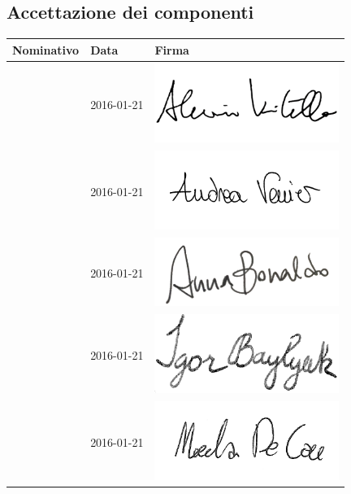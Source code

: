 \documentclass[12pt,a4paper]{article}
\begin{document}
\subsection{Accettazione dei componenti}

\begin{table}[H]
	\begin{center}
		\begin{tabular}{l l l}
			\toprule
            \textbf{Nominativo}	& \textbf{Data} & \textbf{Firma} \\ \midrule
			\midrule
			\AVI{} & 2016-01-21 & \includegraphics[width=6cm]{../img/firmaVitella.png} \\ \midrule
			\AVE{} & 2016-01-21 & \includegraphics[width=6cm]{../img/firmaVenier.png} \\ \midrule
			\AB{} & 2016-01-21 & \includegraphics[width=6cm]{../img/firmaBonaldo.png} \\ \midrule
            \IB{} & 2016-01-21 & \includegraphics[width=6cm]{../img/firmaBaylyak.png} \\ \midrule
            \NDC{} & 2016-01-21 & \includegraphics[width=6cm]{../img/firmaDeCao.png} \\ \midrule

\end{tabular}
\end{center}
\end{table}
\end{document}
